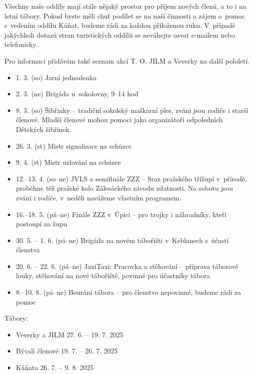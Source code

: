 \documentclass[11pt]{article}
\begin{document}
Všechny naše oddíly mají stále nějaký prostor pro příjem nových členů, a to i na letní tábory. Pokud byste měli chuť podílet se na naší činnosti a zájem o~pomoc s~vedením oddílu Káňat, budeme rádi za každou přiloženou ruku. V~případě jakýchkoli dotazů stran turistických oddílů se neváhejte ozvat e-mailem nebo telefonicky.

Pro informaci přidávám také seznam akcí T. O. JILM a Veverky na další pololetí.

\begin{itemize}[
  itemsep=-3pt,
  leftmargin=1em,
  itemindent=-1em
]
  \item[] 1. 3. (so) Jarní jednodenka
  \item[] 2. 3. (ne) Brigáda u~sokolovny, 9–14 hod
  \item[] 8. 3. (so) Šibřinky – tradiční sokolský maškarní ples, zváni jsou rodiče i starší členové. Mladší členové mohou pomoci jako organizátoři odpoledních Dětských šibřinek.
  \item[] 26. 3. (st) Mistr signalizace na schůzce
  \item[] 9. 4. (st) Mistr uzlování na schůzce
  \item[] 12.–13. 4. (so–ne) JVLS a semifinále ZZZ – Sraz pražského třížupí v~přírodě, proběhne též pražské kolo Zálesáckého závodu zdatnosti. Na sobotu jsou zváni i rodiče, v~neděli navážeme vlastním programem.
  \item[] 16.–18. 5. (pá–ne) Finále ZZZ v~Úpici – pro trojky i náhradníky, kteří postoupí za župu 
  \item[] 30. 5. – 1. 6. (pá–ne) Brigáda na novém tábořišti v~Keblanech s~účastí členstva 
  \item[] 20. 6. – 22. 6. (pá–ne) JaxiTaxi: Pracovka a stěhování – příprava táborové louky, stěhování na nové tábořiště, povinné pro účastníky tábora
  \item[] 8.–10. 8. (pá–ne) Bourání tábora – pro členstvo nepovinné, budeme rádi za pomoc
\end{itemize}

\clearpage

\noindent Tábory:
\begin{itemize}[
  itemsep=-3pt,
  leftmargin=1em,
  itemindent=-1em
]
  \item[] Veverky a JILM    27. 6. – 19. 7. 2025
  \item[] Bývalí členové 19. 7. – 26. 7. 2025
  \item[] Káňata          26. 7. – 9. 8. 2025
\end{itemize}
\end{document}
